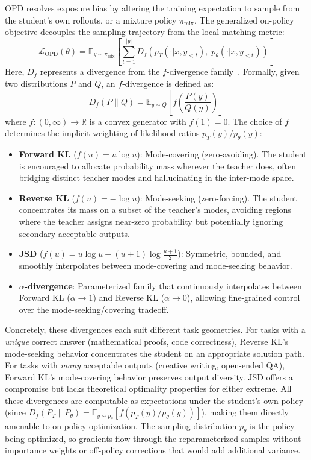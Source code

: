 \documentclass{article} %
\newcommand{\E}{\mathbb{E}}
\newcommand{\ptheta}{p_\theta}
\newcommand{\pteacher}{p_T}
\newcommand{\loss}{\mathcal{L}}
\begin{document}
OPD resolves exposure bias by altering the training expectation to sample from the student's own rollouts, or a mixture policy $\pi_{\mathrm{mix}}$. The generalized on-policy objective decouples the sampling trajectory from the local matching metric:
\begin{equation*}
    \loss_{\mathrm{OPD}}(\theta) = \E_{y \sim \pi_{\mathrm{mix}}} \left[ \sum_{t=1}^{|y|} D_f ( \pteacher(\cdot | x, y_{<t}),\; \ptheta(\cdot | x, y_{<t}) ) \right]
\end{equation*}
Here, $D_f$ represents a divergence from the $f$-divergence family~\citep{2307.15190}. Formally, given two distributions $P$ and $Q$, an $f$-divergence is defined as:
\begin{equation*}
    D_f(P \parallel Q) = \E_{y \sim Q}\left[f\!\left(\frac{P(y)}{Q(y)}\right)\right]
\end{equation*}
where $f: (0,\infty) \to \mathbb{R}$ is a convex generator with $f(1) = 0$. The choice of $f$ determines the implicit weighting of likelihood ratios $\pteacher(y)/\ptheta(y)$:

\begin{itemize}[nosep]
    \item \textbf{Forward KL} ($f(u) = u \log u$): Mode-covering (zero-avoiding). The student is encouraged to allocate probability mass wherever the teacher does, often bridging distinct teacher modes and hallucinating in the inter-mode space.
    \item \textbf{Reverse KL} ($f(u) = -\log u$): Mode-seeking (zero-forcing). The student concentrates its mass on a subset of the teacher's modes, avoiding regions where the teacher assigns near-zero probability but potentially ignoring secondary acceptable outputs.
    \item \textbf{JSD} ($f(u) = u\log u - (u+1)\log\frac{u+1}{2}$): Symmetric, bounded, and smoothly interpolates between mode-covering and mode-seeking behavior.
    \item \textbf{$\alpha$-divergence}: Parameterized family that continuously interpolates between Forward KL ($\alpha \to 1$) and Reverse KL ($\alpha \to 0$), allowing fine-grained control over the mode-seeking/covering tradeoff.
\end{itemize}

Concretely, these divergences each suit different task geometries. For tasks with a \emph{unique} correct answer (mathematical proofs, code correctness), Reverse KL's mode-seeking behavior concentrates the student on an appropriate solution path. For tasks with \emph{many} acceptable outputs (creative writing, open-ended QA), Forward KL's mode-covering behavior preserves output diversity. JSD offers a compromise but lacks theoretical optimality properties for either extreme. All these divergences are computable as expectations under the student's own policy (since $D_f(P_T \parallel P_\theta) = \E_{y \sim \ptheta}[f(\pteacher(y)/\ptheta(y))]$), making them directly amenable to on-policy optimization. The sampling distribution $\ptheta$ is the policy being optimized, so gradients flow through the reparameterized samples without importance weights or off-policy corrections that would add additional variance.
\end{document}
